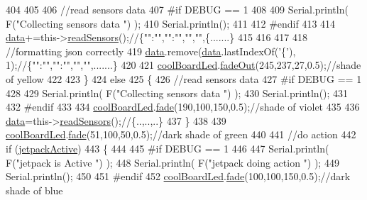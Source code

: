 \begin{DoxyCode}
404         
405                 
406         \textcolor{comment}{//read sensors data}
407 \textcolor{preprocessor}{    #if DEBUG == 1}
408 
409         Serial.println( F(\textcolor{stringliteral}{"Collecting sensors data "}) );
410         Serial.println();
411 
412 \textcolor{preprocessor}{    #endif}
413 
414         \hyperlink{classCoolBoard_a427fb753dd8575bdf821c70a5c63d695}{data}+=this->\hyperlink{classCoolBoard_ad03abdce2e65f520bbf2cff0f2d083cf}{readSensors}();\textcolor{comment}{//\{"":"","":"","","",\{.......\}}
415 
416         
417 
418         \textcolor{comment}{//formatting json correctly}
419         \hyperlink{classCoolBoard_a427fb753dd8575bdf821c70a5c63d695}{data}.remove(\hyperlink{classCoolBoard_a427fb753dd8575bdf821c70a5c63d695}{data}.lastIndexOf(\textcolor{charliteral}{'\{'}), 1);\textcolor{comment}{//\{"":"","":"","","",.......\}}
420 
421         \hyperlink{classCoolBoard_a1b1d3c684a5baa56b08486e192fd8e97}{coolBoardLed}.\hyperlink{classCoolBoardLed_a93d545679237e8cc858324367149775c}{fadeOut}(245,237,27,0.5);\textcolor{comment}{//shade of yellow}
422                 
423     \}   
424     \textcolor{keywordflow}{else}
425     \{
426         \textcolor{comment}{//read sensors data}
427 \textcolor{preprocessor}{    #if DEBUG == 1}
428 
429         Serial.println( F(\textcolor{stringliteral}{"Collecting sensors data "}) );
430         Serial.println();
431 
432 \textcolor{preprocessor}{    #endif}
433 
434         \hyperlink{classCoolBoard_a1b1d3c684a5baa56b08486e192fd8e97}{coolBoardLed}.\hyperlink{classCoolBoardLed_af1cacbaa88db8bcf6042c1083ba41155}{fade}(190,100,150,0.5);\textcolor{comment}{//shade of violet        }
435 
436         \hyperlink{classCoolBoard_a427fb753dd8575bdf821c70a5c63d695}{data}=this->\hyperlink{classCoolBoard_ad03abdce2e65f520bbf2cff0f2d083cf}{readSensors}();\textcolor{comment}{//\{..,..,..\}}
437     \}
438 
439     \hyperlink{classCoolBoard_a1b1d3c684a5baa56b08486e192fd8e97}{coolBoardLed}.\hyperlink{classCoolBoardLed_af1cacbaa88db8bcf6042c1083ba41155}{fade}(51,100,50,0.5);\textcolor{comment}{//dark shade of green  }
440 
441     \textcolor{comment}{//do action}
442     \textcolor{keywordflow}{if} (\hyperlink{classCoolBoard_a9be03a913d26e558328935ca3b59a75e}{jetpackActive})
443     \{
444 
445 \textcolor{preprocessor}{    #if DEBUG == 1}
446 
447         Serial.println( F(\textcolor{stringliteral}{"jetpack is Active "}) );
448         Serial.println( F(\textcolor{stringliteral}{"jetpack doing action "}) );
449         Serial.println();
450     
451 \textcolor{preprocessor}{    #endif}
452         \hyperlink{classCoolBoard_a1b1d3c684a5baa56b08486e192fd8e97}{coolBoardLed}.\hyperlink{classCoolBoardLed_af1cacbaa88db8bcf6042c1083ba41155}{fade}(100,100,150,0.5);\textcolor{comment}{//dark shade of blue }

\end{DoxyCode}
